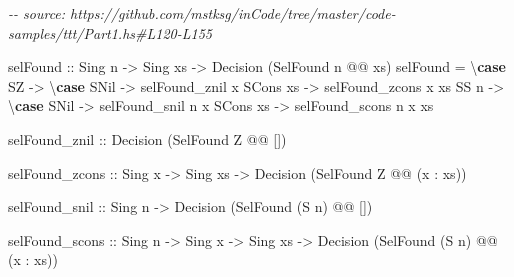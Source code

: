 \documentclass[]{article}
\newenvironment{Shaded}{}{}
\newcommand{\CommentTok}[1]{\textcolor[rgb]{0.38,0.63,0.69}{\textit{#1}}}
\newcommand{\DataTypeTok}[1]{\textcolor[rgb]{0.56,0.13,0.00}{#1}}
\newcommand{\KeywordTok}[1]{\textcolor[rgb]{0.00,0.44,0.13}{\textbf{#1}}}
\newcommand{\NormalTok}[1]{#1}
\newcommand{\OperatorTok}[1]{\textcolor[rgb]{0.40,0.40,0.40}{#1}}
\newcommand{\OtherTok}[1]{\textcolor[rgb]{0.00,0.44,0.13}{#1}}
\begin{document}
\begin{Shaded}
\begin{Highlighting}[]
\CommentTok{{-}{-} source: https://github.com/mstksg/inCode/tree/master/code{-}samples/ttt/Part1.hs\#L120{-}L155}

\NormalTok{selFound}
\OtherTok{    ::} \DataTypeTok{Sing}\NormalTok{ n}
    \OtherTok{{-}>} \DataTypeTok{Sing}\NormalTok{ xs}
    \OtherTok{{-}>} \DataTypeTok{Decision}\NormalTok{ (}\DataTypeTok{SelFound}\NormalTok{ n }\OperatorTok{@@}\NormalTok{ xs)}
\NormalTok{selFound }\OtherTok{=}\NormalTok{ \textbackslash{}}\KeywordTok{case}
    \DataTypeTok{SZ} \OtherTok{{-}>}\NormalTok{ \textbackslash{}}\KeywordTok{case}
      \DataTypeTok{SNil}         \OtherTok{{-}>}\NormalTok{ selFound\_znil}
\NormalTok{      x }\OtherTok{\textasciigrave{}SCons\textasciigrave{}}\NormalTok{ xs }\OtherTok{{-}>}\NormalTok{ selFound\_zcons x xs}
    \DataTypeTok{SS}\NormalTok{ n }\OtherTok{{-}>}\NormalTok{ \textbackslash{}}\KeywordTok{case}
      \DataTypeTok{SNil}         \OtherTok{{-}>}\NormalTok{ selFound\_snil n}
\NormalTok{      x }\OtherTok{\textasciigrave{}SCons\textasciigrave{}}\NormalTok{ xs }\OtherTok{{-}>}\NormalTok{ selFound\_scons n x xs}

\NormalTok{selFound\_znil}
\OtherTok{    ::} \DataTypeTok{Decision}\NormalTok{ (}\DataTypeTok{SelFound} \DataTypeTok{\textquotesingle{}Z} \OperatorTok{@@}\NormalTok{ \textquotesingle{}[])}

\NormalTok{selFound\_zcons}
\OtherTok{    ::} \DataTypeTok{Sing}\NormalTok{ x}
    \OtherTok{{-}>} \DataTypeTok{Sing}\NormalTok{ xs}
    \OtherTok{{-}>} \DataTypeTok{Decision}\NormalTok{ (}\DataTypeTok{SelFound} \DataTypeTok{\textquotesingle{}Z} \OperatorTok{@@}\NormalTok{ (x \textquotesingle{}}\OperatorTok{:}\NormalTok{ xs))}

\NormalTok{selFound\_snil}
\OtherTok{    ::} \DataTypeTok{Sing}\NormalTok{ n}
    \OtherTok{{-}>} \DataTypeTok{Decision}\NormalTok{ (}\DataTypeTok{SelFound}\NormalTok{ (}\DataTypeTok{\textquotesingle{}S}\NormalTok{ n) }\OperatorTok{@@}\NormalTok{ \textquotesingle{}[])}

\NormalTok{selFound\_scons}
\OtherTok{    ::} \DataTypeTok{Sing}\NormalTok{ n}
    \OtherTok{{-}>} \DataTypeTok{Sing}\NormalTok{ x}
    \OtherTok{{-}>} \DataTypeTok{Sing}\NormalTok{ xs}
    \OtherTok{{-}>} \DataTypeTok{Decision}\NormalTok{ (}\DataTypeTok{SelFound}\NormalTok{ (}\DataTypeTok{\textquotesingle{}S}\NormalTok{ n) }\OperatorTok{@@}\NormalTok{ (x \textquotesingle{}}\OperatorTok{:}\NormalTok{ xs))}
\end{Highlighting}
\end{Shaded}
\end{document}
